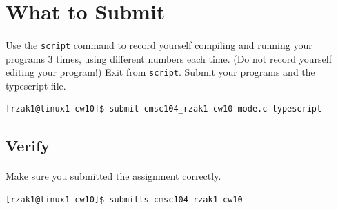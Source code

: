 \documentclass[letter,11pt]{article}
\begin{document}
\section*{What to Submit}
\paragraph{}Use the \texttt{script} command to record yourself compiling and running your programs 3 times, using different numbers each time. (Do not record yourself editing your program!) Exit from \texttt{script}. Submit your programs and the typescript file.

\begin{verbatim}
[rzak1@linux1 cw10]$ submit cmsc104_rzak1 cw10 mode.c typescript
\end{verbatim}

\subsection*{Verify}
\paragraph{}Make sure you submitted the assignment correctly.
\begin{verbatim}
[rzak1@linux1 cw10]$ submitls cmsc104_rzak1 cw10
\end{verbatim}
\end{document}
